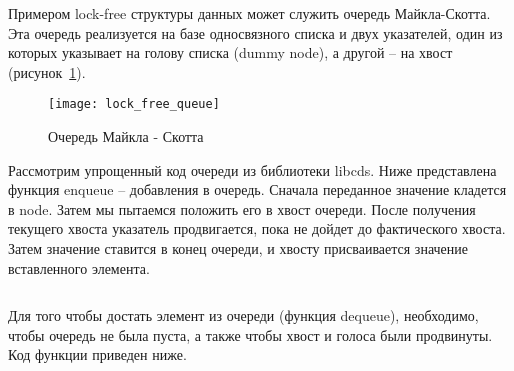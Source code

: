 Примером lock-free структуры данных может служить очередь Майкла-Скотта. Эта очередь реализуется на базе односвязного списка и двух указателей, один из которых указывает на голову списка (dummy node), а другой -- на хвост (рисунок~\ref{lockFreeQueue:image}).

\begin{figure}
    \centering
    \texttt{[image: lock\_free\_queue]}
    \caption{Очередь Майкла - Скотта}
    \label{lockFreeQueue:image}
\end{figure}
	
Рассмотрим упрощенный код очереди из библиотеки libcds. Ниже представлена функция enqueue -- добавления в очередь. Сначала переданное значение кладется в node. Затем мы пытаемся положить его в хвост очереди. После получения текущего хвоста указатель продвигается, пока не дойдет до фактического хвоста. Затем значение ставится в конец очереди, и хвосту присваивается значение вставленного элемента.

\inputminted{c++}{listings/lockFreeQueueEnqueue.cpp}
	
Для того чтобы достать элемент из очереди (функция dequeue), необходимо, чтобы очередь не была пуста, а также чтобы хвост и голоса были продвинуты. Код функции приведен ниже.
\inputminted{c++}{listings/lockFreeQueueDequeue.cpp}


